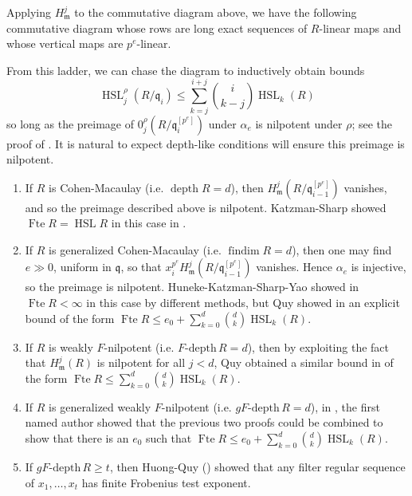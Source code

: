 \documentclass{amsproc}
\theoremstyle{definition}
\theoremstyle{remark}
\numberwithin{equation}{section}
\newcommand{\fm}{\mathfrak{m}}
\newcommand{\fq}{\mathfrak{q}}
\newcommand{\fbp}[1]{\left[ #1 \right]}
\newcommand{\fte}{\operatorname{Fte}}
\newcommand{\fdp}{F\text{-depth}\,}
\newcommand{\gfdp}{gF\text{-depth}\,}
\newcommand{\findim}{\operatorname{findim}}
\newcommand{\HSL}{\operatorname{HSL}}
\begin{document}
Applying $H^j_\fm$ to the commutative diagram above, we have the following commutative diagram whose rows are long exact sequences of $R$-linear maps and whose vertical maps are $p^e$-linear. \begin{center}
\end{center} From this ladder, we can chase the diagram to inductively obtain bounds \[\HSL_j^\rho(R/\fq_i) \le \sum_{k=j}^{i+j} \binom{i}{k-j} \HSL_k(R)\] so long as the preimage of $0^\rho_j\left(R/\fq_i^{\fbp{p^e}}\right)$ under $\alpha_e$ is nilpotent under $\rho$; see the proof of \cite[Thm. 3.1]{Mad19}. It is natural to expect depth-like conditions will ensure this preimage is nilpotent. \begin{enumerate}
    \item If $R$ is Cohen-Macaulay (i.e. $\operatorname{depth} R = d$), then $H^j_\fm\left(R/\fq_{i-1}^{\fbp{p^e}}\right)$ vanishes, and so the preimage described above is nilpotent. Katzman-Sharp showed $\fte R = \HSL R$ in this case in \cite{KS06}.
    \item If $R$ is generalized Cohen-Macaulay (i.e. $\findim R = d$), then one may find $e \gg 0$, uniform in $\fq$, so that $x_i^{p^e} H^j_\fm\left(R/\fq_{i-1}^{\fbp{p^e}}\right)$ vanishes. Hence $\alpha_e$ is injective, so the preimage is nilpotent. Huneke-Katzman-Sharp-Yao showed in \cite{HKSY06} $\fte R <\infty$ in this case by different methods, but Quy showed in \cite{Quy19} an explicit bound of the form $\fte R \le e_0 + \sum_{k=0}^d \binom{d}{k} \HSL_k(R)$. 
    \item If $R$ is weakly $F$-nilpotent (i.e. $\fdp R = d$), then by exploiting the fact that $H^j_\fm(R)$ is nilpotent for all $j<d$, Quy obtained a similar bound in \cite{Quy19} of the form $\fte R \le \sum_{k=0}^d \binom{d}{k}\HSL_k(R)$. 
    \item If $R$ is generalized weakly $F$-nilpotent (i.e. $\gfdp R = d$), in \cite{Mad19}, the first named author showed that the previous two proofs could be combined to show that there is an $e_0$ such that $\fte R \le e_0 + \sum_{k=0}^d \binom{d}{k} \HSL_k(R)$.
    \item If $\gfdp R \ge t$, then Huong-Quy (\cite{HQ22}) showed that any filter regular sequence of $x_1,\ldots,x_t$ has finite Frobenius test exponent.
\end{enumerate} 
\end{document}
